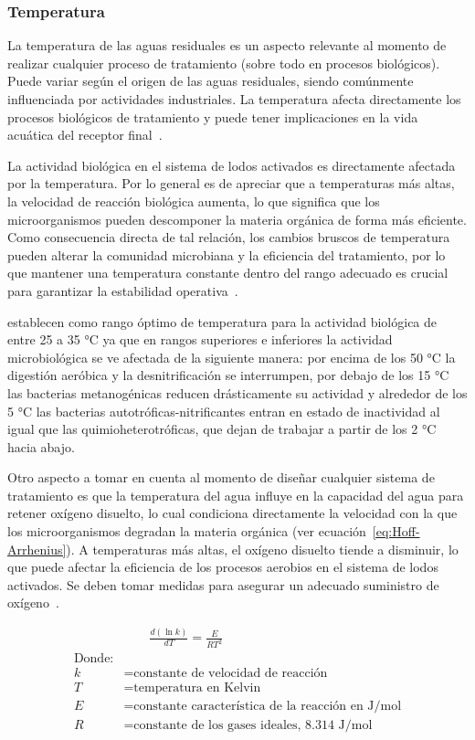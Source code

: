 \subsubsection{Temperatura}
La temperatura de las aguas residuales es un aspecto relevante al momento de realizar cualquier proceso de tratamiento (sobre todo en procesos biológicos). Puede variar según el origen de las aguas residuales, siendo comúnmente influenciada por actividades industriales. La temperatura afecta directamente los procesos biológicos de tratamiento y puede tener implicaciones en la vida acuática del receptor final~\citep{lazcano2016}.\par
La actividad biológica en el sistema de lodos activados es directamente afectada por la temperatura. Por lo general es de apreciar que a temperaturas más altas, la velocidad de reacción biológica aumenta, lo que significa que los microorganismos pueden descomponer la materia orgánica de forma más eficiente. Como consecuencia directa de tal relación, los cambios bruscos de temperatura pueden alterar la comunidad microbiana y la eficiencia del tratamiento, por lo que mantener una temperatura constante dentro del rango adecuado es crucial para garantizar la estabilidad operativa~\citep{delgadillo2005}.\par
\cite{metcalf2003} establecen como rango óptimo de temperatura para la actividad biológica de entre 25 a 35 °C ya que en rangos superiores e inferiores la actividad microbiológica se ve afectada de la siguiente manera: por encima de los 50 °C la digestión aeróbica y la desnitrificación se interrumpen, por debajo de los 15 °C las bacterias metanogénicas reducen drásticamente su actividad y alrededor de los 5 °C las bacterias autotróficas-nitrificantes entran en estado de inactividad al igual que las quimioheterotróficas, que dejan de trabajar a partir de los 2 °C hacia abajo.\par
Otro aspecto a tomar en cuenta al momento de diseñar cualquier sistema de tratamiento es que la temperatura del agua influye en la capacidad del agua para retener oxígeno disuelto, lo cual condiciona directamente la velocidad con la que los microorganismos degradan la materia orgánica (ver ecuación~\ref{eq:Hoff-Arrhenius}). A temperaturas más altas, el oxígeno disuelto tiende a disminuir, lo que puede afectar la eficiencia de los procesos aerobios en el sistema de lodos activados. Se deben tomar medidas para asegurar un adecuado suministro de oxígeno~\citep{crites2000,serway2007}.\par
\begin{equation} \label{eq:Hoff-Arrhenius}
	\begin{split}
		&\qquad\frac{d(\ln{k})}{dT} = \frac{E}{RT^2}\\
			\text{Donde:} \\
			k& = \text{constante de velocidad de reacción}\\
			T& = \text{temperatura en Kelvin}\\
			E& = \text{constante característica de la reacción en J/mol}\\
			R& = \text{constante de los gases ideales, 8.314 J/mol}
	\end{split}
\end{equation}
